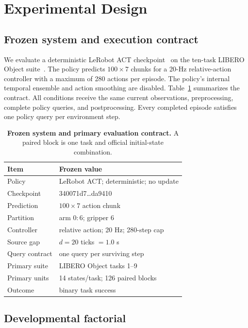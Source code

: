 \section{Experimental Design}
\label{sec:experiments}

\subsection{Frozen system and execution contract}

We evaluate a deterministic LeRobot ACT checkpoint~\cite{zhao2023act} on the
ten-task LIBERO Object suite~\cite{liu2023libero}. The policy predicts
$100\!\times\!7$ chunks for a 20-Hz relative-action controller with a maximum
of 280 actions per episode. The policy's internal temporal ensemble and action
smoothing are disabled. Table~\ref{tab:contract} summarizes the contract. All
conditions receive the same current observations, preprocessing, complete
policy queries, and postprocessing. Every completed episode satisfies one
policy query per environment step.

\begin{table}[t]
\caption{\textbf{Frozen system and primary evaluation contract.} A paired
block is one task and official initial-state combination.}
\label{tab:contract}
\centering
\footnotesize
\setlength{\tabcolsep}{3.2pt}
\begin{tabular}{ll}
\toprule
Item & Frozen value \\
\midrule
Policy & LeRobot ACT; deterministic; no update \\
Checkpoint & 340071d7\ldots da9410 \\
Prediction & $100\times7$ action chunk \\
Partition & arm $0{:}6$; gripper $6$ \\
Controller & relative action; 20 Hz; 280-step cap \\
Source gap & $d=20$ ticks $=1.0$ s \\
Query contract & one query per surviving step \\
Primary suite & LIBERO Object tasks 1--9 \\
Primary units & 14 states/task; 126 paired blocks \\
Outcome & binary task success \\
\bottomrule
\end{tabular}
\end{table}

\subsection{Developmental factorial}

